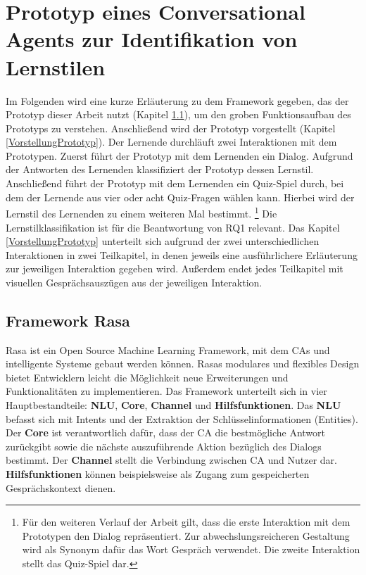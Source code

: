 \chapter{Prototyp eines Conversational Agents zur Identifikation von Lernstilen}
Im Folgenden wird eine kurze Erläuterung zu dem Framework gegeben, das der Prototyp dieser Arbeit nutzt (Kapitel \ref{RasaFramework}),
um den groben Funktionsaufbau des Prototyps zu verstehen.
Anschließend wird der Prototyp vorgestellt (Kapitel \ref{VorstellungPrototyp}). Der Lernende durchläuft zwei Interaktionen mit 
dem Prototypen. Zuerst führt der Prototyp mit dem Lernenden ein Dialog. Aufgrund der Antworten des 
Lernenden klassifiziert der Prototyp dessen Lernstil. 
Anschließend führt der Prototyp mit dem Lernenden 
ein Quiz-Spiel durch, bei dem der Lernende aus vier oder acht Quiz-Fragen wählen kann. 
Hierbei wird der Lernstil des Lernenden zu einem weiteren Mal bestimmt. \footnote{Für den weiteren Verlauf der Arbeit gilt, dass die erste Interaktion mit dem Prototypen den Dialog repräsentiert. Zur abwechslungsreicheren Gestaltung wird als Synonym dafür das Wort Gespräch verwendet. Die zweite Interaktion stellt das Quiz-Spiel dar. } 
Die Lernstilklassifikation ist für die Beantwortung von RQ1 relevant.
Das Kapitel \ref{VorstellungPrototyp} unterteilt sich aufgrund der zwei unterschiedlichen Interaktionen 
in zwei Teilkapitel, in denen jeweils eine ausführlichere Erläuterung zur jeweiligen Interaktion gegeben wird.
Außerdem endet jedes Teilkapitel mit visuellen Gesprächsauszügen aus der jeweiligen Interaktion.


\section{Framework Rasa}\label{RasaFramework}
Rasa ist ein Open Source Machine Learning Framework, mit dem CAs und intelligente Systeme gebaut werden können. 
Rasas modulares und flexibles Design bietet Entwicklern leicht die Möglichkeit neue Erweiterungen und Funktionalitäten zu implementieren.
Das Framework unterteilt sich in vier Hauptbestandteile: \textbf{NLU}, \textbf{Core}, \textbf{Channel} und \textbf{Hilfsfunktionen}.
Das \textbf{NLU} befasst sich mit Intents und der Extraktion der Schlüsselinformationen (Entities).
Der \textbf{Core} ist verantwortlich dafür, dass der CA die bestmögliche Antwort zurückgibt sowie die nächste auszuführende Aktion bezüglich des Dialogs bestimmt.
Der \textbf{Channel} stellt die Verbindung zwischen CA und Nutzer dar.
\textbf{Hilfsfunktionen} können beispielsweise als Zugang zum gespeicherten Gesprächskontext dienen. \parencite[25]{Kong.2021} 

